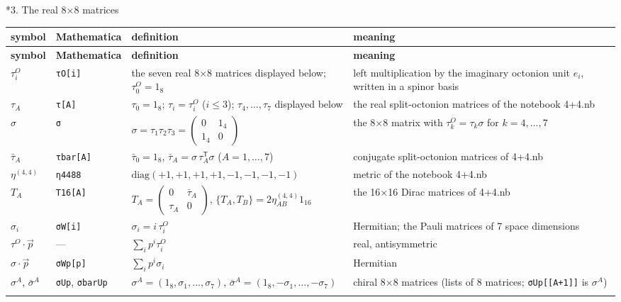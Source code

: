 \documentclass[10pt,a4paper]{article}
\makeatletter
\renewcommand\section{\@startsection{section}{1}{\z@}{-3.5ex \@plus -1ex \@minus -.2ex}{2.3ex \@plus.2ex}{\normalfont\Large\bfseries\raggedright}}
\makeatother
\begin{document}
\section*{3. The real 8×8 matrices}
{\small
\begin{longtable}{>{\raggedright\arraybackslash}p{}>{\raggedright\arraybackslash}p{}>{\raggedright\arraybackslash}p{}>{\raggedright\arraybackslash}p{}}
\toprule
\textbf{symbol} & \textbf{Mathematica} & \textbf{definition} & \textbf{meaning} \\
\midrule\endfirsthead
\toprule
\textbf{symbol} & \textbf{Mathematica} & \textbf{definition} & \textbf{meaning} \\
\midrule\endhead
\endfoot
\bottomrule\endlastfoot
$\tau^{O}_i$ & \texttt{τO[i]} & the seven real 8×8 matrices displayed below; $\tau^{O}_0=1_8$ & left multiplication by the imaginary octonion unit $e_i$, written in a spinor basis \\
$\tau_A$ & \texttt{τ[A]} & $\tau_0=1_8$; $\tau_i=\tau^{O}_i$ ($i\le3$); $\tau_4,\dots,\tau_7$ displayed below & the real split-octonion matrices of the notebook 4+4.nb \\
$\sigma$ & \texttt{σ} & $\sigma=\tau_1\tau_2\tau_3=\left(\begin{smallmatrix}0&1_4\\1_4&0\end{smallmatrix}\right)$ & the 8×8 matrix with $\tau^{O}_k=\tau_k\sigma$ for $k=4,\dots,7$ \\
$\bar\tau_A$ & \texttt{τbar[A]} & $\bar\tau_0=1_8$, $\bar\tau_A=\sigma\,\tau_A^{\mathsf T}\sigma$ ($A=1,\dots,7$) & conjugate split-octonion matrices of 4+4.nb \\
$\eta^{(4,4)}$ & \texttt{η4488} & $\mathrm{diag}(+1,+1,+1,+1,-1,-1,-1,-1)$ & metric of the notebook 4+4.nb \\
$T_A$ & \texttt{T16[A]} & $T_A=\left(\begin{smallmatrix}0&\bar\tau_A\\\tau_A&0\end{smallmatrix}\right)$, $\lbrace T_A,T_B\rbrace=2\eta^{(4,4)}_{AB}1_{16}$ & the 16×16 Dirac matrices of 4+4.nb \\
$\sigma_i$ & \texttt{σW[i]} & $\sigma_i=i\,\tau^{O}_i$ & Hermitian; the Pauli matrices of 7 space dimensions \\
$\tau^{O}\cdot\vec p$ & — & $\sum_ip^i\tau^{O}_i$ & real, antisymmetric \\
$\sigma\cdot\vec p$ & \texttt{σWp[p]} & $\sum_ip^i\sigma_i$ & Hermitian \\
$\sigma^A$, $\bar\sigma^A$ & \texttt{σUp}, \texttt{σbarUp} & $\sigma^A=(1_8,\sigma_1,\dots,\sigma_7)$, $\bar\sigma^A=(1_8,-\sigma_1,\dots,-\sigma_7)$ & chiral 8×8 matrices (lists of 8 matrices; \texttt{σUp[[A+1]]} is $\sigma^A$) \\*
\end{longtable}}
\end{document}
